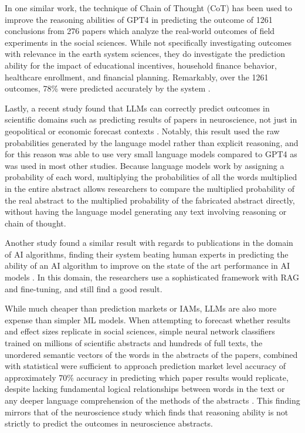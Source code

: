 \documentclass[12pt,a4paper]{article}
\begin{document}
In one similar work, the technique of Chain of Thought (CoT) has been used to improve the reasoning abilities of GPT4 in predicting the outcome of 1261 conclusions from 276 papers which analyze the real-world outcomes of field experiments in the social sciences. While not specifically investigating outcomes with relevance in the earth system sciences, they do investigate the prediction ability for the impact of educational incentives, household finance behavior, healthcare enrollment, and financial planning. Remarkably, over the 1261 outcomes, 78\% were predicted accurately by the system .


Lastly, a recent study found that LLMs can correctly predict outcomes in scientific domains such as predicting results of papers in neuroscience, not just in geopolitical or economic forecast contexts . Notably, this result used the raw probabilities generated by the language model rather than explicit reasoning, and for this reason was able to use very small language models compared to GPT4 as was used in most other studies. Because language models work by assigning a probability of each word,  multiplying the probabilities of all the words multiplied in the entire abstract allows researchers to compare the multiplied probability of the real abstract to the multiplied probability of the fabricated abstract directly, without having the language model generating any text involving reasoning or chain of thought. 

Another study found a similar result with regards to publications in the domain of AI algorithms, finding their system beating human experts in predicting the ability of an AI algorithm to improve on the state of the art performance in AI models . In this domain, the researchers use a sophisticated framework with RAG and fine-tuning, and still find a good result.

While much cheaper than prediction markets or IAMs, LLMs are also more expense than simpler ML models. When attempting to forecast whether results and effect sizes replicate in social sciences, simple neural network classifiers trained on millions of scientific abstracts and hundreds of full texts, the unordered semantic vectors of the words in the abstracts of the papers, combined with statistical  were sufficient to approach prediction market level accuracy of approximately 70\% accuracy in predicting which paper results would replicate, despite lacking fundamental logical relationships between words in the text or any deeper language comprehension of the methods of the abstracts . This finding mirrors that of the neuroscience study  which finds that reasoning  ability is not strictly to predict the outcomes in neuroscience abstracts. 
\end{document}
